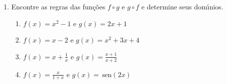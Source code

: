 \documentclass[a4paper,5pt]{amsbook}
\newcommand{\sen}{\,\mbox{sen}}
\begin{document}
\begin{enumerate}
    \vspace{0.5cm}
    \item Encontre as regras das fun\c{c}\~oes $f\circ g$ e $g\circ f$ e determine
        seus dom\'{\i}nios.
        \begin{enumerate}
            \vspace{0.3cm}
            \item $f(x)=x^2-1$ e $g(x)=2x+1$
            \vspace{0.3cm}
            \item $f(x)=x-2$ e $g(x)=x^2+3x+4$
            \vspace{0.3cm}
            \item $f(x)=x+\displaystyle\frac{1}{x}$ e $g(x)=\displaystyle\frac{x+1}{x+2}$
            \vspace{0.3cm}
            \item $f(x)=\displaystyle\frac{x}{1+x}$ e $g(x)=\sen(2x)$
        \end{enumerate}
\end{enumerate}
\end{document}
